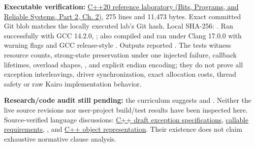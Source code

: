 \textbf{Executable verification:} \href{../01-Bits-Programs-and-Reliable-Systems-P02/main.pdf\#source-file-32e93bc026677e074aaa7771}{C++20 reference laboratory (Bits, Programs, and Reliable Systems, Part 2, Ch. 2)}, 275 lines and 11,473 bytes. Exact committed Git blob  matches the locally executed lab's Git hash. Local SHA-256: . Ran successfully with GCC 14.2.0, ; also compiled and ran under Clang 17.0.0 with warning flags and GCC release-style . Outputs reported . The tests witness resource counts, strong-state preservation under one injected failure, callback lifetimes, overload shapes, , and explicit endian encoding; they do not prove all exception interleavings, driver synchronization, exact allocation costs, thread safety or raw Kairo implementation behavior.

\textbf{Research/code audit still pending:} the curriculum suggests  and . Neither the live source revisions nor user-project build/test results have been inspected here. Source-verified language discussions: \href{https://eel.is/c++draft/except.spec}{C++ draft exception specifications}, \href{https://en.cppreference.com/w/cpp/utility/functional/function}{ callable requirements}, \href{https://en.cppreference.com/w/cpp/numeric/bit_cast}{}, and \href{https://en.cppreference.com/w/cpp/language/object}{C++ object representation}. Their existence does not claim exhaustive normative clause analysis.

